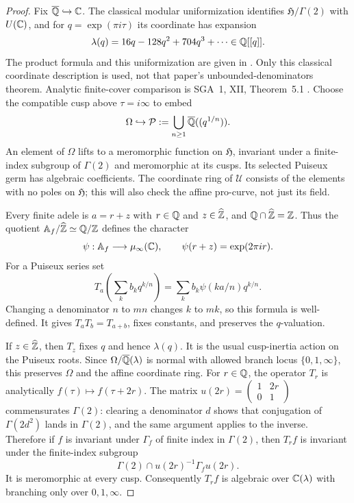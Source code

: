 \begin{proof}
Fix $\overline{\mathbb Q}\hookrightarrow\mathbb C$. The classical modular
uniformization identifies
$\mathfrak H/\Gamma(2)$ with $U(\mathbb C)$, and for
$q=\exp(\pi i\tau)$ its coordinate has expansion
\[
 \lambda(q)=16q-128q^2+704q^3+\cdots\in\mathbb Q[[q]].
\]
The product formula and this uniformization are given in
\citet[p.~628, equation~(1.0.2) and the following paragraph]{F_CDT2025}.
Only this classical coordinate description is used, not that
paper's unbounded-denominators theorem. Analytic finite-cover
comparison is SGA~1, XII, Theorem~5.1 \citep{F_SGA1}.
Choose the compatible cusp above $\tau=i\infty$ to embed
\[
 \Omega\hookrightarrow
 \mathcal P:=\bigcup_{n\ge1}\overline{\mathbb Q}((q^{1/n})).
\]
An element of $\Omega$ lifts to a meromorphic function on
$\mathfrak H$, invariant under a finite-index subgroup of
$\Gamma(2)$ and meromorphic at its cusps. Its selected Puiseux
germ has algebraic coefficients. The coordinate ring of
$\mathcal U$ consists of the elements with no poles on
$\mathfrak H$; this will also check the affine pro-curve, not
just its field.

Every finite adele is $a=r+z$ with $r\in\mathbb Q$ and
$z\in\widehat{\mathbb Z}$, and $\mathbb Q\cap\widehat{\mathbb Z}=\mathbb Z$.
Thus the quotient $\mathbb A_f/\widehat{\mathbb Z}\simeq\mathbb Q/\mathbb Z$
defines the character
\[
 \psi:\mathbb A_f\longrightarrow\mu_\infty(\mathbb C),
 \qquad \psi(r+z)=\exp(2\pi i r).
\]
For a Puiseux series set
\[
 T_a\left(\sum_k b_kq^{k/n}\right)
       =\sum_k b_k\psi(ka/n)q^{k/n}.
\]
Changing a denominator $n$ to $mn$ changes $k$ to $mk$,
so this formula is well-defined. It gives
$T_aT_b=T_{a+b}$, fixes constants, and preserves the
$q$-valuation.

If $z\in\widehat{\mathbb Z}$, then $T_z$ fixes $q$ and hence
$\lambda(q)$. It is the usual cusp-inertia action on the
Puiseux roots. Since $\Omega/\overline{\mathbb Q}(\lambda)$ is normal
with allowed branch locus $\{0,1,\infty\}$, this preserves
$\Omega$ and the affine coordinate ring.
For $r\in\mathbb Q$, the operator $T_r$ is analytically
$f(\tau)\mapsto f(\tau+2r)$. The matrix
$u(2r)=\left(\begin{smallmatrix}1&2r\\0&1\end{smallmatrix}\right)$
commensurates $\Gamma(2)$: clearing a denominator $d$ shows that
conjugation of $\Gamma(2d^2)$ lands in $\Gamma(2)$, and the
same argument applies to the inverse. Therefore if $f$ is
invariant under $\Gamma_f$ of finite index in $\Gamma(2)$,
then $T_rf$ is invariant under the finite-index subgroup
\[
 \Gamma(2)\cap u(2r)^{-1}\Gamma_f u(2r).
\]
It is meromorphic at every cusp. Consequently $T_rf$ is
algebraic over $\mathbb C(\lambda)$ with branching only over
$0,1,\infty$.


\end{proof}
